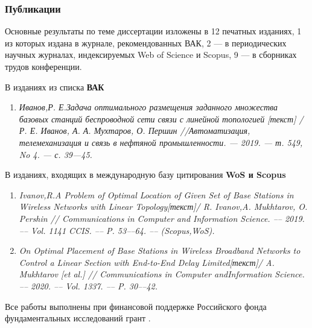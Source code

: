 \begin{frame}
    \frametitle{Публикации}
    \fontsize{8pt}{7.2}\selectfont

    Основные результаты по теме диссертации изложены в 12 печатных изданиях, 1 из которых издана в журнале, рекомендованных ВАК, 2 — в периодических научных журналах, индексируемых Web of Science и Scopus, 9 — в сборниках трудов конференции. 
    
    \bigskip
    
    В изданиях из списка \textbf{ВАК} 
    \begin{enumerate}
        \item \textit{Иванов,Р. Е.Задача оптимального размещения заданного множе­ства базовых станций беспроводной сети связи с линейной топо­логией [текст] / Р. Е. Иванов, А. А. Мухтаров, О. Першин //Автоматизация, телемеханизация и связь в нефтяной промышлен­ности. — 2019. — т. 549, No 4. — с. 39—45.}
    \end{enumerate}

    \bigskip

    В изданиях, входящих в международную базу цитирования \textbf{WoS и Scopus}

    \begin{enumerate}
        \item \textit{Ivanov,R.A Problem of Optimal Location of Given Set of Base Sta­tions in Wireless Networks with Linear Topology[текст]/ R. Ivanov,A. Mukhtarov, O. Pershin // Communications in Computer and Infor­mation Science. –– 2019. –– Vol. 1141 CCIS. –– P. 53––64. –– (Scopus,WoS).}
        \item  \textit{On Optimal Placement of Base Stations in Wireless Broadband Net­works to Control a Linear Section with End-to-End Delay Limited[текст]/ A. Mukhtarov [et al.] // Communications in Computer andInformation Science. –– 2020. –– Vol. 1337. –– P. 30––42.}
    \end{enumerate}

    \bigskip

    Все работы выполнены при финансовой поддержке Российского фонда фундаментальных исследований грант .
\end{frame}

